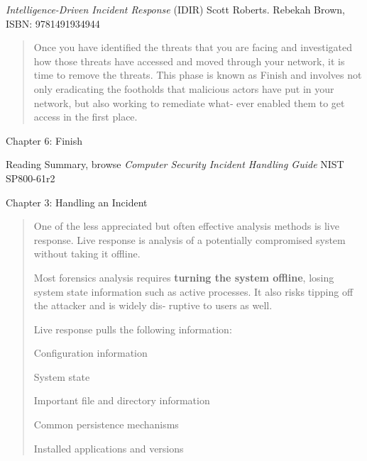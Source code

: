 \documentclass[Screen16to9,17pt]{foils}
\begin{document}

\emph{Intelligence-Driven Incident Response} (IDIR)
 Scott Roberts. Rebekah Brown, ISBN: 9781491934944

\begin{quote}
Once you have identified the threats that you are facing and investigated how those
threats have accessed and moved through your network, it is time to remove the
threats. This phase is known as Finish and involves not only eradicating the footholds
that malicious actors have put in your network, but also working to remediate what‐
ever enabled them to get access in the first place.
\end{quote}

\begin{list2}
\item Chapter 6: Finish
\end{list2}

Reading Summary, browse \emph{Computer Security Incident Handling Guide} NIST SP800-61r2
\begin{list2}
\item  Chapter 3: Handling an Incident
\end{list2}




\begin{quote}
One of the less appreciated but often effective analysis methods is live response. Live
response is analysis of a potentially compromised system without taking it offline.

Most forensics analysis requires {\bf turning the system offline}, losing system state information such as active processes. It also risks tipping off the attacker and is widely dis‐
ruptive to users as well.

Live response pulls the following information:
\begin{list2}
\item Configuration information
\item System state
\item Important file and directory information
\item Common persistence mechanisms
\item Installed applications and versions
\end{list2}
\end{quote}


\end{document}
